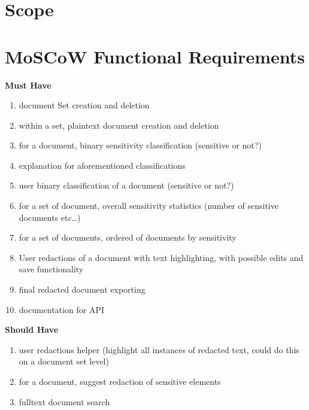 \documentclass{l4proj}
\begin{document}
\section{Scope}

\section{MoSCoW Functional Requirements}

\begin{minipage}[t]{.5\linewidth}
    \centerline{\textbf{Must Have}}
    \begin{enumerate}[label=\textbf{M\arabic*}]
        \item document Set creation and deletion
        \item within a set, plaintext document creation and deletion
        \item for a document, binary sensitivity classification (sensitive or not?)
        \item explanation for aforementioned classifications
        \item user binary classification of a document (sensitive or not?)
        \item for a set of document, overall sensitivity statistics (number of sensitive documents etc…)
        \item for a set of documents, ordered of documents by sensitivity
        \item User redactions of a document with text highlighting, with possible edits and save functionality
        \item final redacted document exporting
        \item documentation for API
    \end{enumerate}
\end{minipage}
\hfill
\noindent
\begin{minipage}[t]{.5\linewidth}
    \centerline{\textbf{Should Have}}
    \begin{enumerate}[label=\textbf{S\arabic*}]
        \item user redactions helper (highlight all instances of redacted text, could do this on a document set level)
        \item for a document, suggest redaction of sensitive elements
        \item fulltext document search
    \end{enumerate}
\end{minipage}
\end{document}
